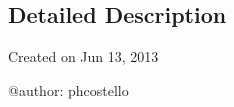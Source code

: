\subsection{\-Detailed \-Description}
\begin{DoxyVerb}
Created on Jun 13, 2013

@author: phcostello
\end{DoxyVerb}
 